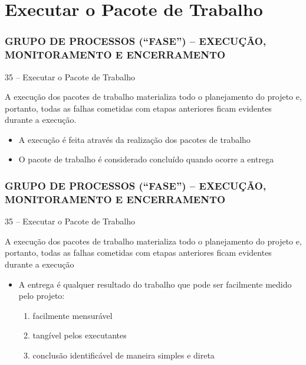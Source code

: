 \section{Executar o Pacote de Trabalho}
\begin{frame}
 \frametitle{GRUPO DE PROCESSOS (“FASE”) – \small{EXECUÇÃO, MONITORAMENTO E ENCERRAMENTO}}
 35 – Executar o Pacote de Trabalho
\begin{block}{}
 A execução dos pacotes de trabalho materializa todo o planejamento do projeto e, portanto, todas as falhas cometidas com etapas anteriores ficam evidentes durante a execução.
\end{block}
\begin{itemize}
 \item A execução é feita através da realização dos pacotes de trabalho
 \item O pacote de trabalho é considerado concluído quando ocorre  a entrega
\end{itemize}
\end{frame}

\begin{frame}
 \frametitle{GRUPO DE PROCESSOS (“FASE”) – \small{EXECUÇÃO, MONITORAMENTO E ENCERRAMENTO}}
 35 – Executar o Pacote de Trabalho
\begin{block}{}
 A execução dos pacotes de trabalho materializa todo o planejamento do projeto e, portanto, todas as falhas cometidas com etapas anteriores ficam evidentes durante a execução
\end{block}
\begin{itemize}
 \item A entrega é qualquer resultado do trabalho que pode ser facilmente medido pelo projeto:
 \begin{enumerate}
  \item facilmente mensurável
  \item tangível pelos executantes
  \item conclusão identificável de maneira simples e direta
 \end{enumerate}
\end{itemize}
\end{frame}

